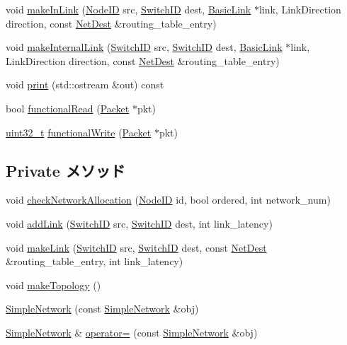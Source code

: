 \begin{DoxyCompactItemize}
\item 
void \hyperlink{classSimpleNetwork_ac4cf8ff50e877f26606c24880c73fb9d}{makeInLink} (\hyperlink{TypeDefines_8hh_a83c14b4ae37e80071f6b3506a6c46151}{NodeID} src, \hyperlink{TypeDefines_8hh_ac925a332c83eaf1e40e056e7a20ebcd8}{SwitchID} dest, \hyperlink{classBasicLink}{BasicLink} $\ast$link, LinkDirection direction, const \hyperlink{classNetDest}{NetDest} \&routing\_\-table\_\-entry)
\item 
void \hyperlink{classSimpleNetwork_a035f37231d3a7edcadd92b7d9e17d4e4}{makeInternalLink} (\hyperlink{TypeDefines_8hh_ac925a332c83eaf1e40e056e7a20ebcd8}{SwitchID} src, \hyperlink{TypeDefines_8hh_ac925a332c83eaf1e40e056e7a20ebcd8}{SwitchID} dest, \hyperlink{classBasicLink}{BasicLink} $\ast$link, LinkDirection direction, const \hyperlink{classNetDest}{NetDest} \&routing\_\-table\_\-entry)
\item 
void \hyperlink{classSimpleNetwork_ac55fe386a101fbae38c716067c9966a0}{print} (std::ostream \&out) const 
\item 
bool \hyperlink{classSimpleNetwork_a729f57f557bb42c045c47d9388f1030e}{functionalRead} (\hyperlink{classPacket}{Packet} $\ast$pkt)
\item 
\hyperlink{Type_8hh_a435d1572bf3f880d55459d9805097f62}{uint32\_\-t} \hyperlink{classSimpleNetwork_ad07b9def1d6f5e5f988a254c3a9d1ad9}{functionalWrite} (\hyperlink{classPacket}{Packet} $\ast$pkt)
\end{DoxyCompactItemize}
\subsection*{Private メソッド}
\begin{DoxyCompactItemize}
\item 
void \hyperlink{classSimpleNetwork_a6536f357a006b030ddba64fbe086b608}{checkNetworkAllocation} (\hyperlink{TypeDefines_8hh_a83c14b4ae37e80071f6b3506a6c46151}{NodeID} id, bool ordered, int network\_\-num)
\item 
void \hyperlink{classSimpleNetwork_a62004334638177e52a711f5dd2f2d1a1}{addLink} (\hyperlink{TypeDefines_8hh_ac925a332c83eaf1e40e056e7a20ebcd8}{SwitchID} src, \hyperlink{TypeDefines_8hh_ac925a332c83eaf1e40e056e7a20ebcd8}{SwitchID} dest, int link\_\-latency)
\item 
void \hyperlink{classSimpleNetwork_adbadd4382922414e5feb364d39cf9efe}{makeLink} (\hyperlink{TypeDefines_8hh_ac925a332c83eaf1e40e056e7a20ebcd8}{SwitchID} src, \hyperlink{TypeDefines_8hh_ac925a332c83eaf1e40e056e7a20ebcd8}{SwitchID} dest, const \hyperlink{classNetDest}{NetDest} \&routing\_\-table\_\-entry, int link\_\-latency)
\item 
void \hyperlink{classSimpleNetwork_a6f69a0a7780a760ca9556e4e801c0a44}{makeTopology} ()
\item 
\hyperlink{classSimpleNetwork_a4c77599a6ef119fb4a2c8b388dffabe0}{SimpleNetwork} (const \hyperlink{classSimpleNetwork_1_1SimpleNetwork}{SimpleNetwork} \&obj)
\item 
\hyperlink{classSimpleNetwork_1_1SimpleNetwork}{SimpleNetwork} \& \hyperlink{classSimpleNetwork_a687133dea31dd57750ef6a35b7a3da7c}{operator=} (const \hyperlink{classSimpleNetwork_1_1SimpleNetwork}{SimpleNetwork} \&obj)
\end{DoxyCompactItemize}
